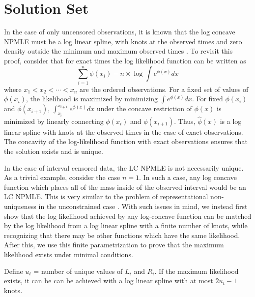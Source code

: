 { \section{Solution Set}
\label{sec:s_set} }

In the case of only uncensored observations, it is known that the log concave NPMLE must be a log linear spline, with knots at the observed times and zero density outside the minimum and maximum observed times \cite{RefRuf2007}. To revisit this proof, consider that for exact times the log likelihood function can be written as	
	\[ \displaystyle \sum_{i = 1}^n \phi(x_i) - n \times \log \int e^{\phi(x)} dx
	\]
where $x_1<x_2<\cdots<x_n$ are the ordered observations. For a fixed set of values of $\phi(x_i)$, the likelihood is maximized by minimizing $\int e^{\phi(x)} dx$. For fixed $\phi(x_i)$ and $\phi(x_{i+1})$, $\int_{x_i}^{x_{i+1}} e^{\phi(x)}dx$ under the concave restriction of $\phi(x)$ is minimized by linearly connecting $\phi(x_i)$ and $\phi(x_{i+1})$. Thus, $\hat \phi(x)$ is a log linear spline with knots at the observed times in the case of exact observations. The concavity of the log-likelihood function with exact observations ensures that the solution exists and is unique.
		
	In the case of interval censored data, the LC NPMLE is not necessarily unique. As a trivial example, consider the case $n = 1$. In such a case, any log concave function which places all of the mass inside of the observed interval would be an LC NPMLE. This is very similar to the problem of representational non-uniqueness in the unconstrained case \cite{RefGV2002}. With such issues in mind, we instead first show that the log likelihood achieved by any log-concave function can be matched by the log likelihood from a log linear spline with a finite number of knots, while recognizing that there may be other functions which have the same likelihood. After this, we use this finite parametrization to prove that the maximum likelihood exists under minimal conditions. 
	

	\vspace{3mm}

	\begin{thm}
	\label{thm1}
	Define $u_t$ = number of unique values of $L_i$ and $R_i$. If the maximum likelihood exists, it can be can be achieved with a log linear spline with at most $2u_t-1$ knots.
	\end{thm}
	
